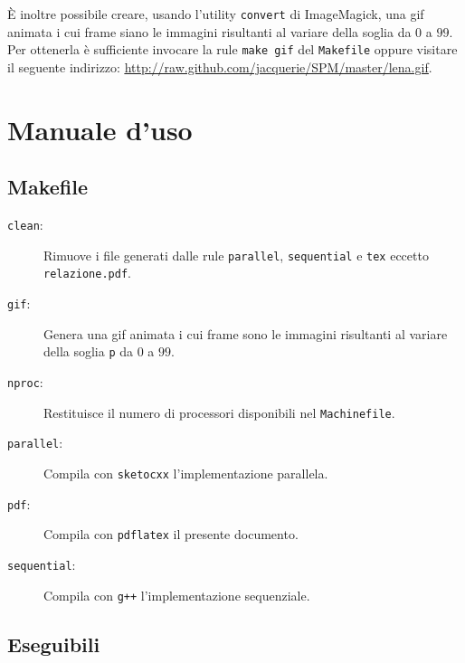 \documentclass[12pt]{article}
\begin{document}
    È inoltre possibile creare, usando l'utility \texttt{convert} di
    ImageMagick, una gif animata i cui frame siano le immagini risultanti
    al variare della soglia da \(0\) a \(99\). Per ottenerla \`e sufficiente
    invocare la rule \texttt{make gif} del \texttt{Makefile} oppure visitare il
    seguente indirizzo: \href{http://raw.github.com/jacquerie/SPM/master/lena.gif}{\underline{http://raw.github.com/jacquerie/SPM/master/lena.gif}}.

  \newpage

  \appendix
    \section{Manuale d'uso}
      \subsection{Makefile}

      \begin{description}
	\item[\texttt{clean}:] Rimuove i file generati dalle rule \texttt{parallel}, \texttt{sequential} e \texttt{tex} eccetto \texttt{relazione.pdf}.
        \item[\texttt{gif}:] Genera una gif animata i cui frame sono le
          immagini risultanti al variare della soglia \texttt{p} da \(0\) a
          \(99\).
	\item[\texttt{nproc}:] Restituisce il numero di processori disponibili nel
	  \texttt{Machinefile}.
        \item[\texttt{parallel}:] Compila con \texttt{sketocxx}
          l'implementazione parallela.
  	\item[\texttt{pdf}:] Compila con \texttt{pdflatex} il presente
	  documento.
        \item[\texttt{sequential}:] Compila con \texttt{g++} l'implementazione
          sequenziale.
      \end{description}

      \subsection{Eseguibili}
\end{document}
